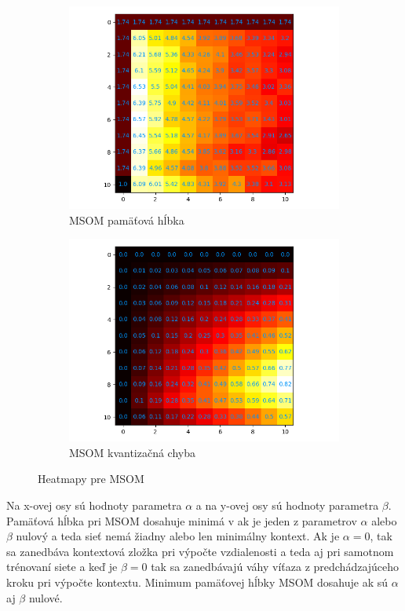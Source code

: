 \begin{figure}[H]
    \centering
    \begin{subfigure}{.5\textwidth}
        \centering
        \includegraphics[width=\linewidth]{assets/msom_memory_span}
        \caption{MSOM pamäťová hĺbka}
        \label{fig:sub1}
    \end{subfigure}%
    \begin{subfigure}{.5\textwidth}
        \centering
        \includegraphics[width=\linewidth]{assets/msom_quantization_errors}
        \caption{MSOM kvantizačná chyba}
        \label{fig:sub2}
    \end{subfigure}
    \caption{Heatmapy pre MSOM}
    \label{fig:test}
\end{figure}
 Na x-ovej osy sú hodnoty parametra $\alpha$ a na y-ovej osy sú hodnoty parametra $\beta$. 
 Pamäťová hĺbka pri MSOM dosahuje minimá v ak je jeden z parametrov $\alpha$ alebo $\beta$ nulový a teda sieť nemá
 žiadny alebo len minimálny kontext. Ak je $\alpha = 0$, tak sa zanedbáva kontextová zložka pri výpočte vzdialenosti a 
 teda aj pri samotnom trénovaní siete a keď je $\beta = 0$ tak sa zanedbávajú váhy víťaza z predchádzajúceho kroku pri výpočte kontextu.
 Minimum pamäťovej hĺbky MSOM dosahuje ak sú $\alpha$ aj $\beta$ nulové.


